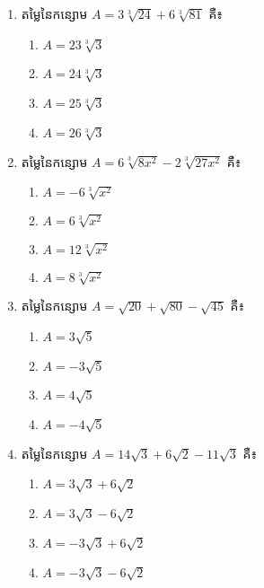 \begin{enumerate}
\item តម្លៃនៃកន្សោម $A=3\sqrt[3]{24}+6\sqrt[3]{81}$ គឺ៖
\begin{multicols}{4}
\begin{enumerate}[label=\alph*.]
	\item $A=23\sqrt[3]{3}$
	\item $A=24\sqrt[3]{3}$
	\item $A=25\sqrt[3]{3}$
	\item $A=26\sqrt[3]{3}$	
\end{enumerate}
\end{multicols}

\item តម្លៃនៃកន្សោម $A=6\sqrt[3]{8x^2}-2\sqrt[3]{27x^2}$ គឺ៖
\begin{multicols}{4}
\begin{enumerate}[label=\alph*.]
	\item $A=-6\sqrt[3]{x^2}$
	\item $A=6\sqrt[3]{x^2}$
	\item $A=12\sqrt[3]{x^2}$
	\item $A=8\sqrt[3]{x^2}$
\end{enumerate}
\end{multicols}

\item តម្លៃនៃកន្សោម $A=\sqrt{20}+\sqrt{80}-\sqrt{45}$ គឺ៖
\begin{multicols}{4}
\begin{enumerate}[label=\alph*.]
	\item $A=3\sqrt{5}$
	\item $A=-3\sqrt{5}$
	\item $A=4\sqrt{5}$
	\item $A=-4\sqrt{5}$
\end{enumerate}
\end{multicols}


\item តម្លៃនៃកន្សោម $A=14\sqrt{3}+6\sqrt{2}-11\sqrt{3}$ គឺ៖
\begin{multicols}{2}
\begin{enumerate}[label=\alph*.]
	\item $A=3\sqrt{3}+6\sqrt{2}$
	\item $A=3\sqrt{3}-6\sqrt{2}$
	\item $A=-3\sqrt{3}+6\sqrt{2}$
	\item $A=-3\sqrt{3}-6\sqrt{2}$
\end{enumerate}
\end{multicols}


\end{enumerate}
